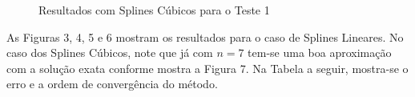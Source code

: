 \documentclass[12pt,a4paper]{report}
\begin{document}
\begin{figure}[H]
\centering
{}
\caption{Resultados com Splines Cúbicos para o Teste 1}
\end{figure}
\newpage
As Figuras 3, 4, 5 e 6 mostram os resultados para o caso de Splines Lineares. No caso dos Splines Cúbicos, note que já com $n=7$ tem-se uma boa aproximação com a solução exata conforme mostra a Figura 7. Na Tabela a seguir, mostra-se o erro e a ordem de convergência do método.
\end{document}
